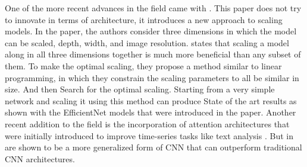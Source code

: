 \documentclass[../main.tex]{subfiles}
\begin{document}
One of the more recent advances in the field came with \cite{effnet}. This paper does not try to innovate in terms of architecture,
it introduces a new approach to scaling models. In the paper, the authors consider three dimensions in which the model can be scaled, depth, width, and image resolution.
\cite{effnet} states that scaling a model along in all three dimensions together is much more beneficial than any subset of them.
To make the optimal scaling, they propose a method similar to linear programming, in which they constrain the scaling parameters to all be similar in size.
And then Search for the optimal scaling.
Starting from a very simple network and scaling it using this method can produce State of the art results
as shown with the EfficientNet models that were introduced in the paper.
Another recent addition to the field is the incorporation of attention architectures that were initially introduced to improve
time-series tasks like text analysis \cite{attention}. But in \cite{image-attention} are shown to be a more generalized
form of CNN that can outperform traditional CNN architectures.
\end{document}
